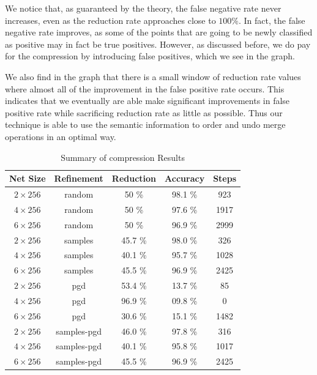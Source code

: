 We notice that, as guaranteed by the theory, the false negative rate never
increases, even as the reduction rate approaches close to $100\%$. In fact, the
false negative rate improves, as some of the points that are going
to be newly classified as positive may in fact be true positives.  
However, as discussed before, we do pay for the compression by introducing false
positives, which we see in the graph. 

We also find in the graph that there is a
small window of reduction rate values where almost all of the improvement in the
false positive rate occurs. This indicates that we eventually are able make 
significant improvements in false positive rate while sacrificing reduction rate
as little as possible. Thus our technique is able to use the semantic
information to order and undo merge operations in an optimal way.

\begin{table}
\begin{tabular}{|c|c|c|c|c|}
\hline
Net Size     & Refinement  & Reduction & Accuracy & Steps  \\ 
\hline
$2\times256$ & random      & 50   \%   & 98.1 \%  &    923 \\ 
$4\times256$ & random      & 50   \%   & 97.6 \%  &   1917 \\ 
$6\times256$ & random      & 50   \%   & 96.9 \%  &   2999 \\ 
$2\times256$ & samples     & 45.7 \%   & 98.0 \%  &    326 \\ 
$4\times256$ & samples     & 40.1 \%   & 95.7 \%  &   1028 \\ 
$6\times256$ & samples     & 45.5 \%   & 96.9 \%  &   2425 \\ 
$2\times256$ & pgd         & 53.4 \%   & 13.7 \%  &     85 \\ 
$4\times256$ & pgd         & 96.9 \%   & 09.8 \%  &      0 \\ 
$6\times256$ & pgd         & 30.6 \%   & 15.1 \%  &   1482 \\ 
$2\times256$ & samples-pgd & 46.0 \%   & 97.8 \%  &    316 \\ 
$4\times256$ & samples-pgd & 40.1 \%   & 95.8 \%  &   1017 \\ 
$6\times256$ & samples-pgd & 45.5 \%   & 96.9 \%  &   2425 \\ 
\hline
\end{tabular}
\caption{Summary of \mnist compression Results }
\label{t:mnist-compr-summary}
\end{table}

